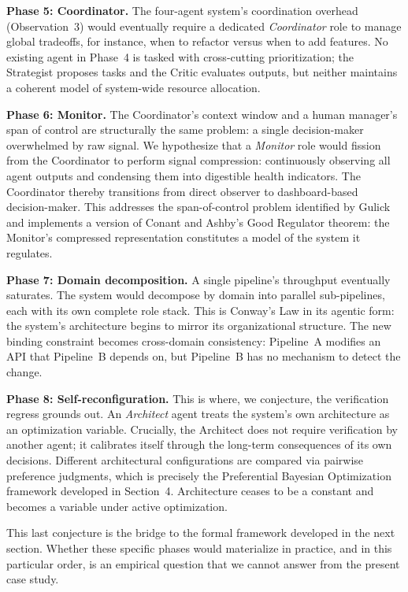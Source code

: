 \textbf{Phase 5: Coordinator.} The four-agent system's coordination overhead (Observation~3) would eventually require a dedicated \emph{Coordinator} role to manage global tradeoffs, for instance, when to refactor versus when to add features. No existing agent in Phase~4 is tasked with cross-cutting prioritization; the Strategist proposes tasks and the Critic evaluates outputs, but neither maintains a coherent model of system-wide resource allocation.

\textbf{Phase 6: Monitor.} The Coordinator's context window and a human manager's span of control are structurally the same problem: a single decision-maker overwhelmed by raw signal. We hypothesize that a \emph{Monitor} role would fission from the Coordinator to perform signal compression: continuously observing all agent outputs and condensing them into digestible health indicators. The Coordinator thereby transitions from direct observer to dashboard-based decision-maker. This addresses the span-of-control problem identified by Gulick \cite{gulick1937} and implements a version of Conant and Ashby's \cite{conant1970} Good Regulator theorem: the Monitor's compressed representation constitutes a model of the system it regulates.

\textbf{Phase 7: Domain decomposition.} A single pipeline's throughput eventually saturates. The system would decompose by domain into parallel sub-pipelines, each with its own complete role stack. This is Conway's Law \cite{conway1968} in its agentic form: the system's architecture begins to mirror its organizational structure. The new binding constraint becomes cross-domain consistency: Pipeline~A modifies an API that Pipeline~B depends on, but Pipeline~B has no mechanism to detect the change.

\textbf{Phase 8: Self-reconfiguration.} This is where, we conjecture, the verification regress grounds out. An \emph{Architect} agent treats the system's own architecture as an optimization variable. Crucially, the Architect does not require verification by another agent; it calibrates itself through the long-term consequences of its own decisions. Different architectural configurations are compared via pairwise preference judgments, which is precisely the Preferential Bayesian Optimization framework developed in Section~4. Architecture ceases to be a constant and becomes a variable under active optimization.

This last conjecture is the bridge to the formal framework developed in the next section. Whether these specific phases would materialize in practice, and in this particular order, is an empirical question that we cannot answer from the present case study.

